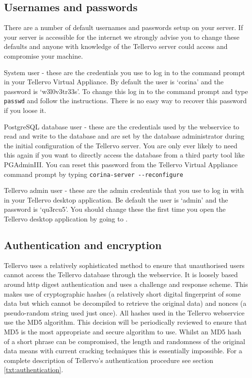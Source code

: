\subsection{Usernames and passwords}
\label{txt:passwords}
There are a number of default usernames and passwords setup on your server.  If your server is accessible for the internet we strongly advise you to change these defaults and anyone with knowledge of the Tellervo server could access and compromise your machine.

\begin{description*}
 \item[System user] - these are the credentials you use to log in to the command prompt in your Tellervo Virtual Appliance.  By default the user is `corina' and the password is `w3l0v3tr33s'.  To change this log in to the command prompt and type \verb|passwd| and follow the instructions.  There is no easy way to recover this password if you loose it.
 \item[PostgreSQL database user] - these are the credentials used by the webservice to read and write to the database and are set by the database administrator during the initial configuration of the Tellervo server. You are only ever likely to need this again if you want to directly access the database from a third party tool like PGAdminIII.  You can reset this password from the Tellervo Virtual Appliance command prompt by typing \verb|corina-server --reconfigure|
 \item[Tellervo admin user] - these are the admin credentials that you use to log in with in your Tellervo desktop application.  Be default the user is `admin' and the password is `qu3rcu5'.  You should change these the first time you open the Tellervo desktop application by going to .
\end{description*}

\subsection{Authentication and encryption}
Tellervo uses a relatively sophisticated method to ensure that unauthorised users cannot access the Tellervo database through the webservice.  It is loosely based around http digest authentication and uses a challenge and response scheme.  This makes use of cryptographic hashes (a relatively short digital fingerprint of some data but which cannot be decompiled to retrieve the original data) and nonces (a pseudo-random string used just once). All hashes used in the Tellervo webservice use the MD5 algorithm. This decision will be periodically reviewed to ensure that MD5 is the most appropriate and secure algorithm to use. Whilst an MD5 hash of a short phrase can be compromised, the length and randomness of the original data means with current cracking techniques this is essentially impossible.   For a complete description of Tellervo's authentication procedure see section \ref{txt:authentication}.

